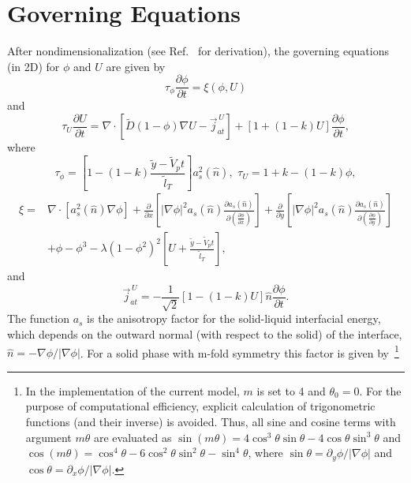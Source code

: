 \documentclass[10pt]{article}
\begin{document}
\section{Governing Equations}
After nondimensionalization (see Ref.~\cite{Echebarria2004} for derivation), the governing equations (in 2D) for $\phi$ and $U$ are given by
\begin{equation}
\label{eqphi}
\tau_\phi\frac{\partial  \phi}{\partial  t} = \xi(\phi,U)
\end{equation}
and 
\begin{equation}
\label{eqU}
\tau_U\frac{\partial  U}{\partial  t} = \nabla \cdot \left[ \tilde{D} (1-\phi) \nabla U - \vec{j}_{at}^{\,U} \right] + [1+(1-k)U]\frac{\partial \phi}{\partial t},
\end{equation}
where
\begin{equation}
\tau_\phi=\left[ 1-(1-k)\frac{\tilde{y}-\tilde{V}_p t}{\tilde{l}_T} \right]a_s^2(\hat{n}),\,\,\tau_U=1+k - (1-k)\phi,
\end{equation}
\begin{equation}
\label{eqxi}
\begin{split}
\xi = & \nabla \cdot  \left[ a_s^2(\hat{n}) \nabla \phi \right] 
+  \frac{\partial}{\partial x} \left[ |\nabla \phi|^2 a_s(\hat{n}) \frac{\partial a_s(\hat{n})}{\partial \left( \frac{\partial \phi}{\partial x} \right)} \right]
+  \frac{\partial}{\partial y} \left[ |\nabla \phi|^2 a_s(\hat{n}) \frac{\partial a_s(\hat{n})}{\partial \left( \frac{\partial \phi}{\partial y} \right)} \right] \\
& +\phi-\phi^3 - \lambda(1-\phi^2)^2 \left[ U + \frac{\tilde{y}-\tilde{V}_p t}{\tilde{l}_T} \right],
\end{split}
\end{equation}
and
\begin{equation}
\label{eqjat}
\vec{j}_{at}^{\,U}=-\frac{1}{\sqrt{2}}[1-(1-k)U]\hat{n}\frac{\partial \phi}{\partial t}.
\end{equation}
The function $a_s$ is the anisotropy factor for the solid-liquid interfacial energy, which depends on the outward normal (with respect to the solid) of the interface, $\hat{n}=-\nabla \phi / |\nabla \phi|$. For a solid phase with m-fold symmetry this factor is given by~\footnote{In the implementation of the current model, $m$ is set to 4 and  $\theta_0=0$. For the purpose of computational efficiency, explicit calculation of trigonometric functions (and their inverse) is avoided. Thus, all sine and cosine terms with argument $m\theta$ are evaluated as $\sin(m\theta)=4\cos^3\theta\sin\theta-4\cos\theta\sin^3\theta$ and $\cos(m\theta)=\cos^4\theta -6\cos^2\theta\sin^2\theta-\sin^4\theta$, where $\sin\theta=\partial_y\phi / |\nabla \phi|$ and $\cos\theta=\partial_x\phi / |\nabla \phi|$.}
\end{document}
